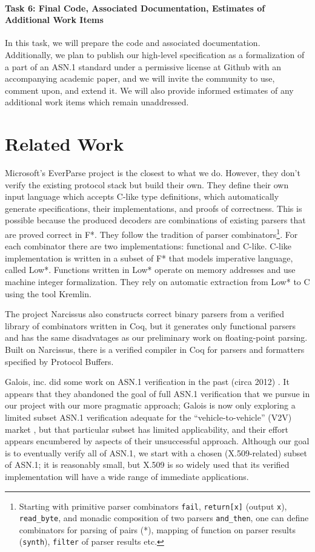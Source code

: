 \documentclass[acmsmall,nonacm]{acmart}
\begin{document}
\paragraph{Task 6: Final Code, Associated Documentation, Estimates of Additional Work Items}
In this task, we will prepare the code and associated documentation. Additionally, we plan to publish our high-level specification as a formalization of a part of an ASN.1 standard under a permissive license at Github with an accompanying academic paper, and we will invite the community to use, comment upon, and extend it. 
We will also provide informed estimates of any additional work items which remain unaddressed. 

\section{Related Work}

Microsoft's EverParse project \cite{RamananandroDFS19} is the closest
to what we do. However, they don't verify the existing protocol stack but
build their own. They define their own input language which accepts
C-like type definitions, which automatically generate specifications, their implementations, and proofs of correctness. This is possible because the produced decoders are combinations of existing parsers that are proved correct in F*. They
follow the tradition of parser combinators\footnote{Starting with
  primitive parser combinators \texttt{fail}, \texttt{return[x]}
  (output \texttt{x}), \texttt{read\_byte}, and monadic composition of
  two parsers \texttt{and\_then}, one can define combinators for
  parsing of pairs (*), mapping of function on parser results
  (\texttt{synth}), \texttt{filter} of parser results etc.}. For each
combinator there are two implementations: functional and
C-like. C-like implementation is written in a subset of F* that models
imperative language, called Low*. Functions written in Low* operate on
memory addresses and use machine integer formalization. They rely on
automatic extraction from Low* to C using the tool Kremlin.

The project Narcissus \cite{Narcissus} also constructs correct binary parsers from a verified
library of combinators written in Coq, but it generates only functional
parsers and has the same disadvatages as our preliminary work on floating-point parsing. Built on Narcissus, there is a verified compiler in Coq for
parsers and formatters specified by Protocol Buffers.
 
Galois, inc. did some work on ASN.1 verification in
the past (circa 2012) \cite{ASN1FormalSem}. It appears that they abandoned
 the goal of full ASN.1 verification \cite{ASN1EncDec} that we pursue in
our project with our more pragmatic approach; Galois is now only
exploring a limited subset ASN.1 verification adequate for the
``vehicle-to-vehicle'' (V2V) market \cite{V2V}, but that
particular subset has limited applicability, and their
effort appears encumbered by aspects of their unsuccessful approach. Although our goal is to eventually verify all of ASN.1, we
start with a chosen (X.509-related) subset of ASN.1; it is reasonably small, but X.509 is so widely used that its verified implementation will have a wide range of immediate applications.
\end{document}
